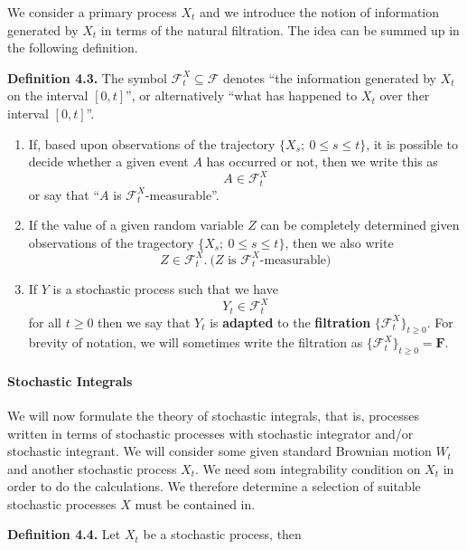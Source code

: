 \documentclass[
]{article}
\providecommand{\tightlist}{%
  \setlength{\itemsep}{0pt}\setlength{\parskip}{0pt}}
\begin{document}
We consider a primary process \(X_t\) and we introduce the notion of
information generated by \(X_t\) in terms of the natural filtration. The
idea can be summed up in the following definition.

\textbf{Definition 4.3.} The symbol
\(\mathcal{F}^X_t\subseteq\mathcal{F}\) denotes ``the information
generated by \(X_t\) on the interval \([0,t]\)'', or alternatively
``what has happened to \(X_t\) over ther interval \([0,t]\)''.

\begin{enumerate}
\def\labelenumi{\arabic{enumi}.}
\tightlist
\item
  If, based upon observations of the trajectory
  \(\{X_s;\ 0\le s\le t\}\), it is possible to decide whether a given
  event \(A\) has occurred or not, then we write this as \[
    A\in\mathcal{F}^X_t
    \] or say that ``\(A\) is \(\mathcal{F}^X_t\)-measurable''.
\item
  If the value of a given random variable \(Z\) can be completely
  determined given observations of the tragectory
  \(\{X_s;\ 0\le s\le t\}\), then we also write \[
    Z\in\mathcal{F}^X_t.\ \text{(}Z\text{ is }\mathcal{F}^X_t\text{-measurable)}
    \]
\item
  If \(Y\) is a stochastic process such that we have \[
    Y_t\in\mathcal{F}^X_t
    \] for all \(t\ge0\) then we say that \(Y_t\) is \textbf{adapted} to
  the \textbf{filtration} \(\{\mathcal{F}^X_t\}_{t\ge 0}\). For brevity
  of notation, we will sometimes write the filtration as
  \(\{\mathcal{F}^X_t\}_{t\ge 0}=\mathbf{F}\).
\end{enumerate}

\hypertarget{stochastic-integrals-1}{%
\paragraph{Stochastic Integrals}\label{stochastic-integrals-1}}

We will now formulate the theory of stochastic integrals, that is,
processes written in terms of stochastic processes with stochastic
integrator and/or stochastic integrant. We will consider some given
standard Brownian motion \(W_t\) and another stochastic process \(X_t\).
We need som integrability condition on \(X_t\) in order to do the
calculations. We therefore determine a selection of suitable stochastic
processes \(X\) must be contained in.

\textbf{Definition 4.4.} Let \(X_t\) be a stochastic process, then
\end{document}
